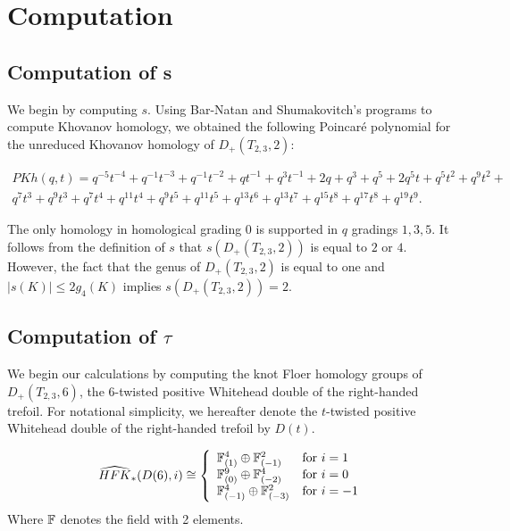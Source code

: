 \section{Computation}
\label{sec:comp}

\subsection{Computation of s}
We begin by computing $s$.  Using Bar-Natan and Shumakovitch's programs \cite{BarNatan,Shumakovitch2} to compute Khovanov homology, we obtained the following Poincar{\'e} polynomial for the unreduced Khovanov homology of $D_+(T_{2,3},2)$:

\begin{eqnarray*}
PKh(q,t)=q^{-5}t^{-4}+q^{-1}t^{-3}+q^{-1}t^{-2}+qt^{-1}+q^3t^{-1}+2q+q^3+q^5+2q^5t+
q^{5}t^2+
q^{9}t^{2}+\\
q^{7}t^{3}+
q^{9}t^{3}+
q^{7}t^{4}+
q^{11}t^{4}+
q^{9}t^{5}+
q^{11}t^{5}+
q^{13}t^{6}+
q^{13}t^{7}+
q^{15}t^{8}+
q^{17}t^{8}+
q^{19}t^{9}.
\end{eqnarray*}

The only homology in homological grading $0$ is supported in $q$ gradings $1,3,5$.  It follows from the definition of $s$ that $s(D_+(T_{2,3},2))$ is equal to $2$ or $4$.  However, the fact that the genus of  $D_+(T_{2,3},2)$ is equal to one and $|s(K)|\le 2g_4(K)$ implies  $s(D_+(T_{2,3},2))=2$.
\subsection{Computation of $\tau$}
We begin our calculations by computing the knot Floer homology groups of $D_+(T_{2,3},6)$, the $6$-twisted positive Whitehead double of the right-handed trefoil.  For notational simplicity, we hereafter denote the $t$-twisted positive Whitehead double of the right-handed trefoil by $D(t)$.  

\begin{prop}
\label{prop:D6}
$$ \HFKa_*(D(6),i)\cong 
\left\{\begin{array}{ll}

	\F_{(1)}^{4}\oplus\F_{(-1)}^2  & {\text{for
 $i=1$}}\\

 \F_{(0)}^{9}\oplus\F_{(-2)}^4  & {\text{for
 $i=0$}}\\

	\F_{(-1)}^{4}\oplus\F_{(-3)}^2  & {\text{for
 $i=-1$}}\\

\end{array}
\right. $$
Where $\F$ denotes the field with 2 elements.	


\end{prop}


